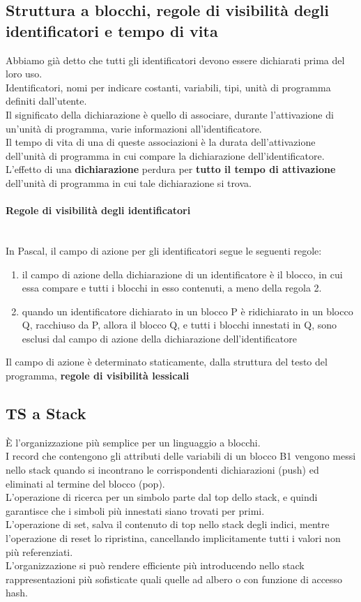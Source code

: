 \documentclass[12pt]{report}
\begin{document}
	\subsection{Struttura a blocchi, regole di visibilità degli identificatori e tempo di vita}
	Abbiamo già detto che tutti gli identificatori devono essere dichiarati prima del loro uso. \\
	Identificatori, nomi per indicare costanti, variabili, tipi, unità di programma definiti dall'utente. \\
	Il significato della dichiarazione è quello di associare, durante l'attivazione di un'unità di programma, varie informazioni all'identificatore. \\
	Il tempo di vita di una di queste associazioni è la durata dell'attivazione dell'unità di programma in cui compare la dichiarazione dell'identificatore. \\
	L'effetto di una \textbf{dichiarazione} perdura per \textbf{tutto il tempo di attivazione} dell'unità di programma in cui tale dichiarazione si trova. \\
	\paragraph{Regole di visibilità degli identificatori} \quad \\
	In Pascal, il campo di azione per gli identificatori segue le seguenti regole:
	\begin{enumerate}
		\item il campo di azione della dichiarazione di un identificatore è il blocco, in cui essa compare e tutti i blocchi in esso contenuti, a meno della regola 2.
		\item quando un identificatore dichiarato in un blocco P è ridichiarato in un blocco Q, racchiuso da P, allora il blocco Q, e tutti i blocchi innestati in Q, sono esclusi dal campo di azione della dichiarazione dell'identificatore
	\end{enumerate}
	Il campo di azione è determinato staticamente, dalla struttura del testo del programma, \textbf{regole di visibilità lessicali}
	\subsection{TS a Stack}
	È l'organizzazione più semplice per un linguaggio a blocchi. \\
	I record che contengono gli attributi delle variabili di un blocco B1 vengono messi nello stack quando si incontrano le corrispondenti dichiarazioni (push) ed eliminati al termine del blocco (pop). \\
	L'operazione di ricerca per un simbolo parte dal top dello stack, e quindi garantisce che i simboli più innestati siano trovati per primi. \\
	L'operazione di set, salva il contenuto di top nello stack degli indici, mentre l'operazione di reset lo ripristina, cancellando implicitamente tutti i valori non più referenziati. \\
	L'organizzazione si può rendere efficiente più introducendo nello stack rappresentazioni più sofisticate quali quelle ad albero o con funzione di accesso hash.
\end{document}
